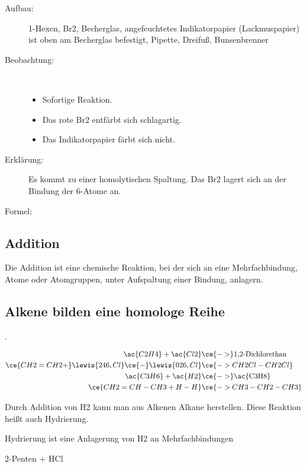 \begin{description}
	\item[Aufbau:] 1-Hexen, \ac{Br2}, Becherglas,
		angefeuchtetes Indikatorpapier (Lackmuspapier) ist oben am Becherglas befestigt,
		Pipette, Dreifuß, Bunsenbrenner
	\item[Beobachtung:]~
	\begin{itemize}
		\item Sofortige Reaktion.
		\item Das rote \ac{Br2} entfärbt sich schlagartig.
		\item Das Indikatorpapier färbt sich nicht.
	\end{itemize}
	\item[Erklärung:] Es kommt zu einer homolytischen Spaltung.
		Das \ac{Br2} lagert sich an der Bindung der \ac{6}-Atome an.
	\item[Formel:]  \ce{-}
\end{description}

\subsection{Addition}
Die Addition ist eine chemische Reaktion, bei der sich an eine Mehrfachbindung, Atome oder
Atomgruppen, unter Aufspaltung einer Bindung, anlagern.

\subsection{Alkene bilden eine homologe Reihe}
.

\vspace{-5ex}
\begin{align}
\ac{C2H4} + \ac{Cl2} & \ce{->} \text{1,2-Dichlorethan} \\
\ce{CH2=CH2 +} \lewis{246,Cl}\ce{-}\lewis{026,Cl} & \ce{-> CH2Cl-CH2Cl} \\
\ac{C3H6} + \ac{H2} & \ce{->} \text{\ac{C3H8}}\\
\ce{CH2=CH-CH3 + H-H}		& \ce{-> CH3-CH2-CH3}
\end{align}

Durch Addition von \ac{H2} kann man aus Alkenen Alkane herstellen.
Diese Reaktion heißt auch Hydrierung.

Hydrierung ist eine Anlagerung von \ac{H2} an Mehrfachbindungen

2-Penten + \ac{HCl}


